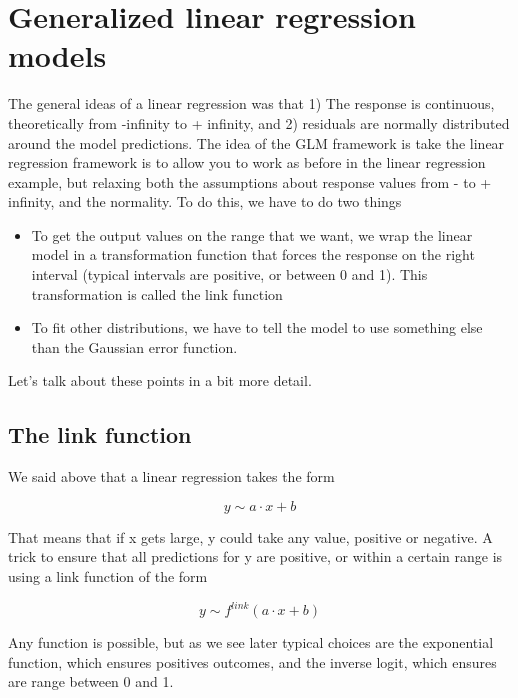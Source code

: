 \documentclass[a4paper,twoside]{tufte-book} %
\begin{document}
\section{Generalized linear regression models}

The general ideas of a linear regression was that 1) The response is continuous, theoretically from -infinity to + infinity, and 2) residuals are normally distributed around the model predictions. The idea of the GLM framework is take the linear regression framework is to allow you to work as before in the linear regression example, but relaxing both the assumptions about response values from - to + infinity, and the normality. To do this, we have to do two things

\begin{itemize}
	\item To get the output values on the range that we want, we wrap the linear model in a transformation function that forces the response on the right interval (typical intervals are positive, or between 0 and 1). This transformation is called the link function
	\item To fit other distributions, we have to tell the model to use something else than the Gaussian error function. 
\end{itemize}    
   
Let's talk about these points in a bit more detail.

\subsection{The link function}

We said above that a linear regression takes the form 

\begin{equation}
y \sim a \cdot x + b 
\end{equation}

That means that if x gets large, y could take any value, positive or negative. A trick to ensure that all predictions for y are positive, or within a certain range is using a link function of the form 

\begin{equation}
y \sim f^{link}(a \cdot x + b )
\end{equation}

Any function is possible, but as we see later typical choices are the exponential function, which ensures positives outcomes, and the inverse logit, which ensures are range between 0 and 1.
\end{document}
